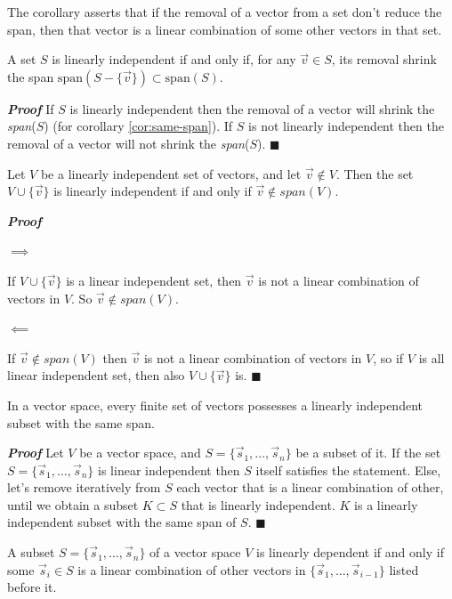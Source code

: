 The corollary asserts that if the removal of a vector from a set don't reduce the span, then that vector is a linear combination of some other vectors in that set.

\begin{corollary}
    A set $S$ is linearly independent if and only if, for any $\vec{v} \in S$, its removal shrink the span $\text{span}(S - \{\vec{v}\}) \subset \text{span}(S)$.
\end{corollary}


\textbf{\textit{Proof}} If $S$ is linearly independent then the removal of a vector will shrink the \textit{span}($S$) (for corollary \ref{cor:same-span}). If $S$ is not linearly independent then the removal of a vector will not shrink the \textit{span}($S$). $\blacksquare$
\\

\begin{lemma}
    Let $V$ be a linearly independent set of vectors, and let $\vec v \notin V$. Then 
    the set $V \cup \{\vec v\}$ is linearly independent if and only if $\vec v \notin \textit{span}(V)$.
\end{lemma}


\textbf{\textit{Proof}}

$\implies$

If $V \cup \{\vec v\}$ is a linear independent set, then $\vec v$ is not a linear combination of vectors in $V$. So  $\vec v \notin \textit{span}(V)$.

$\!\impliedby$

If $\vec v \notin \textit{span}(V)$ then $\vec v$ is not a linear combination of vectors in $V$, so if $V$ is all linear independent set, then also $V \cup \{\vec v\}$ is.
$\blacksquare$


\begin{corollary}
    In a vector space, every finite set of vectors possesses a linearly independent subset with the same span.
\end{corollary}


\textbf{\textit{Proof}} Let $V$ be a vector space, and $S = \{\vec s_1, \dots, \vec s_n\}$ be a subset of it. If the set $S = \{\vec s_1, \dots, \vec s_n\}$ is linear independent then $S$ itself satisfies the statement. Else, let's remove iteratively from $S$ each vector that is a linear combination of other, until we obtain a subset $K \subset S$ that is linearly independent. $K$ is a linearly independent subset
with the same span of $S$.
$\blacksquare$


\begin{corollary}
    A subset $S = \{\vec s_1, \dots, \vec s_n\}$ of a vector space $V$ is linearly dependent if and only if some $\vec s_i \in S$ is a linear combination of other vectors in $\{\vec s_1, \dots, \vec s_{i-1}\}$ listed before it.
\end{corollary}


